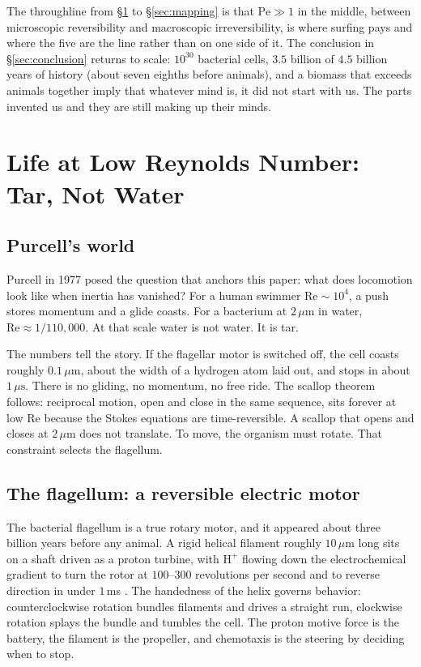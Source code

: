 \documentclass[12pt,a4paper]{article}
\newcommand{\Pe}{\mathrm{Pe}}
\newcommand{\Rey}{\mathrm{Re}}
\begin{document}
The throughline from \S\ref{sec:reynolds} to \S\ref{sec:mapping} is that $\Pe \gg 1$ in the middle, between microscopic reversibility and macroscopic irreversibility, is where surfing pays and where the five are the line rather than on one side of it. The conclusion in \S\ref{sec:conclusion} returns to scale: $10^{30}$ bacterial cells, $3.5$ billion of $4.5$ billion years of history (about seven eighths before animals), and a biomass that exceeds animals together imply that whatever mind is, it did not start with us. The parts invented us and they are still making up their minds.

\section{Life at Low Reynolds Number: Tar, Not Water}
\label{sec:reynolds}

\subsection{Purcell's world}

Purcell in 1977 \cite{purcell1977} posed the question that anchors this paper: what does locomotion look like when inertia has vanished? For a human swimmer $\Rey \sim 10^4$, a push stores momentum and a glide coasts. For a bacterium at $2\,\mu\mathrm{m}$ in water, $\Rey \approx 1/110{,}000$. At that scale water is not water. It is tar.

The numbers tell the story. If the flagellar motor is switched off, the cell coasts roughly $0.1\,\mu\mathrm{m}$, about the width of a hydrogen atom laid out, and stops in about $1\,\mu\mathrm{s}$. There is no gliding, no momentum, no free ride. The scallop theorem follows: reciprocal motion, open and close in the same sequence, sits forever at low $\Rey$ because the Stokes equations are time-reversible. A scallop that opens and closes at $2\,\mu\mathrm{m}$ does not translate. To move, the organism must rotate. That constraint selects the flagellum.

\subsection{The flagellum: a reversible electric motor}

The bacterial flagellum is a true rotary motor, and it appeared about three billion years before any animal. A rigid helical filament roughly $10\,\mu\mathrm{m}$ long sits on a shaft driven as a proton turbine, with $\mathrm{H}^+$ flowing down the electrochemical gradient to turn the rotor at $100$--$300$ revolutions per second and to reverse direction in under $1$\,ms \cite{berg2004}. The handedness of the helix governs behavior: counterclockwise rotation bundles filaments and drives a straight run, clockwise rotation splays the bundle and tumbles the cell. The proton motive force is the battery, the filament is the propeller, and chemotaxis is the steering by deciding when to stop.
\end{document}
